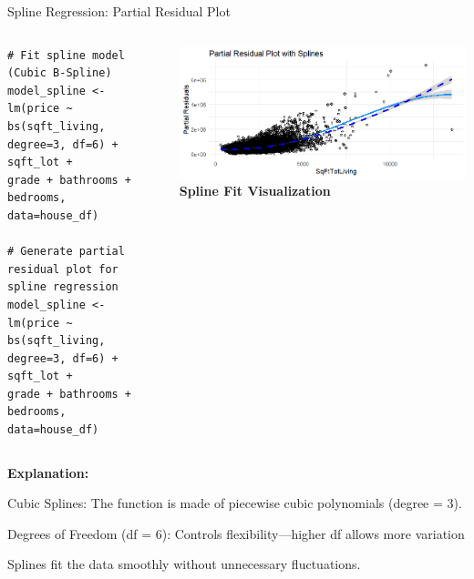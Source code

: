 \documentclass{beamer}
\begin{document}
	\begin{frame}{Spline Regression: Partial Residual Plot}
	\begin{columns}
		\begin{tcolorbox}
			\begin{lstlisting}
# Fit spline model (Cubic B-Spline)
model_spline <- lm(price ~ bs(sqft_living, degree=3, df=6) + sqft_lot +
grade + bathrooms + bedrooms, data=house_df)

# Generate partial residual plot for spline regression
model_spline <- lm(price ~ bs(sqft_living, degree=3, df=6) + sqft_lot +
grade + bathrooms + bedrooms, data=house_df)
\end{lstlisting}
		\end{tcolorbox}
		
		\centering
		\includegraphics[width=\linewidth]{spline.png}
		\textbf{Spline Fit Visualization}
	\end{columns}
	
	\vspace{1em}
	\textbf{Explanation:} 
	\item	Cubic Splines: The function is made of piecewise cubic polynomials (degree = 3).
		\item Degrees of Freedom (df = 6): Controls flexibility—higher df allows more variation
			\item Splines fit the data smoothly without unnecessary fluctuations.
	\end{frame}
	
\end{document}
